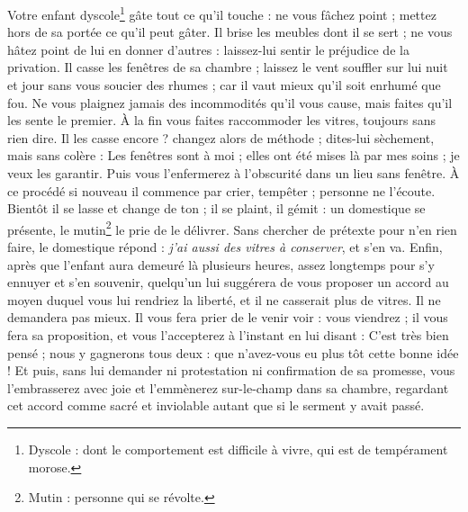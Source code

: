 {Votre enfant dyscole\footnote{Dyscole : dont le comportement est difficile à vivre, qui est de tempérament morose.} gâte tout ce qu’il touche : ne vous fâchez point ; mettez hors de sa portée ce qu’il peut gâter. Il brise les meubles dont il se sert ; ne vous hâtez point de lui en donner d’autres : laissez-lui sentir le préjudice de la privation. Il casse les fenêtres de sa chambre ; laissez le vent souffler sur lui nuit et jour sans vous soucier des rhumes ; car il vaut mieux qu’il soit enrhumé que fou. Ne vous plaignez jamais des incommodités qu’il vous cause, mais faites qu’il les sente le premier. À la fin vous faites raccommoder les vitres, toujours sans rien dire. Il les casse encore ? changez alors de méthode ; dites-lui sèchement, mais sans colère : Les fenêtres sont à moi ; elles ont été mises là par mes soins ; je veux les garantir. Puis vous l’enfermerez à l’obscurité dans un lieu sans fenêtre. À ce procédé si nouveau il commence par crier, tempêter ; personne ne l’écoute. Bientôt il se lasse et change de ton ; il se plaint, il gémit : un domestique se présente, le mutin\footnote{Mutin : personne qui se révolte.} le prie de le délivrer. Sans chercher de prétexte pour n’en rien faire, le domestique répond : \emph{j’ai aussi des vitres à conserver}, et s’en va. Enfin, après que l’enfant aura demeuré là plusieurs heures, assez longtemps pour s’y ennuyer et s’en souvenir, quelqu’un lui suggérera de vous proposer un accord au moyen duquel vous lui rendriez la liberté, et il ne casserait plus de vitres. Il ne demandera pas mieux. Il vous fera prier de le venir voir : vous viendrez ; il vous fera sa proposition, et vous l’accepterez à l’instant en lui disant : C’est très bien pensé ; nous y gagnerons tous deux : que n’avez-vous eu plus tôt cette bonne idée ! Et puis, sans lui demander ni protestation ni confirmation de sa promesse, vous l’embrasserez avec joie et l’emmènerez sur-le-champ dans sa chambre, regardant cet accord comme sacré et inviolable autant que si le serment y avait passé.
}


